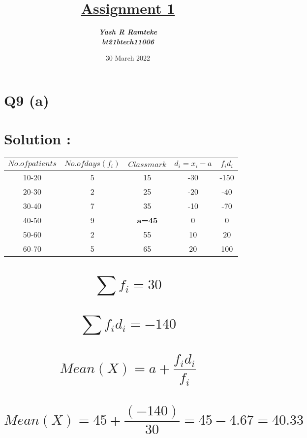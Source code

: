 \documentclass{article}
\title{\textbf{\underline{Assignment 1}}}
\author{\textbf{\textit{Yash R Ramteke}}\\
\textbf{\textit{bt21btech11006}}}
\date{\textbf{}30 March 2022
}
\begin{document}
\maketitle

\section*{Q9 (a)}
\section*{Solution :}

\begin{tabular}{|c|c|c|c|c|}
\hline
     ${No. of patients}$ & ${No. of days(f_i)}$ & ${Class mark}$ & ${d_i=x_i-a}$ & ${f_id_i}$ 
     \\\hline
     10-20 & 5 & 15 & -30 & -150   \\\hline
     20-30 & 2 & 25 & -20 & -40   \\\hline
     30-40 & 7 & 35 & -10 & -70   \\\hline
     40-50 & 9 & \textbf{a=45 }& 0 & 0  \\\hline
     50-60 & 2 & 55 & 10 & 20   \\\hline
     60-70 & 5 & 65 & 20 & 100   \\\hline
     
\end{tabular}

\section*{$$ \sum f_i = 30$$}
\section*{$$\sum f_id_i = -140$$}

\section*{$$Mean(X)=  a + \frac{f_id_i}{f_i}$$}

\section*{$$Mean(X)=  45 + \frac{(-140)}{30} = 45 - 4.67 = 40.33 $$}
\end{document}
